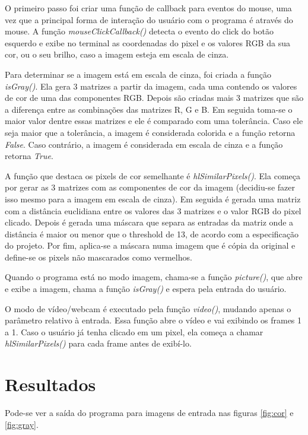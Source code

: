 \documentclass{bmvc2k}
\begin{document}
O primeiro passo foi criar uma função de callback para eventos do mouse, uma vez que a principal forma de interação do usuário com o programa é através do mouse. A função \textit{mouseClickCallback()} detecta o evento do click do botão esquerdo e exibe no terminal as coordenadas do pixel e os valores RGB da sua cor, ou o seu brilho, caso a imagem esteja em escala de cinza.

Para determinar se a imagem está em escala de cinza, foi criada a função \textit{isGray()}. Ela gera 3 matrizes a partir da imagem, cada uma contendo os valores de cor de uma das componentes RGB. Depois são criadas mais 3 matrizes que são a diferença entre as combinações das matrizes R, G e B. Em seguida toma-se o maior valor dentre essas matrizes e ele é comparado com uma tolerância. Caso ele seja maior que a tolerância, a imagem é considerada colorida e a função retorna \textit{False}. Caso contrário, a imagem é considerada em escala de cinza e a função retorna \textit{True}.

A função que destaca os pixels de cor semelhante é \textit{hlSimilarPixels()}. Ela começa por gerar as 3 matrizes com as componentes de cor da imagem (decidiu-se fazer isso mesmo para a imagem em escala de cinza). Em seguida é gerada uma matriz com a distância euclidiana entre os valores das 3 matrizes e o valor RGB do pixel clicado. Depois é gerada uma máscara que separa as entradas da matriz onde a distância é maior ou menor que o threshold de 13, de acordo com a especificação do projeto. Por fim, aplica-se a máscara numa imagem que é cópia da original e define-se os pixels não mascarados como vermelhos.

Quando o programa está no modo imagem, chama-se a função \textit{picture()}, que abre e exibe a imagem, chama a função \textit{isGray()} e espera pela entrada do usuário.

O modo de vídeo/webcam é executado pela função \textit{video()}, mudando apenas o parâmetro relativo à entrada. Essa função abre o vídeo e vai exibindo os frames 1 a 1. Caso o usuário já tenha clicado em um pixel, ela começa a chamar \textit{hlSimilarPixels()} para cada frame antes de exibí-lo.

\section{Resultados}
\label{sec:res}

Pode-se ver a saída do programa para imagens de entrada nas figuras \ref{fig:cor} e \ref{fig:gray}.
\end{document}
